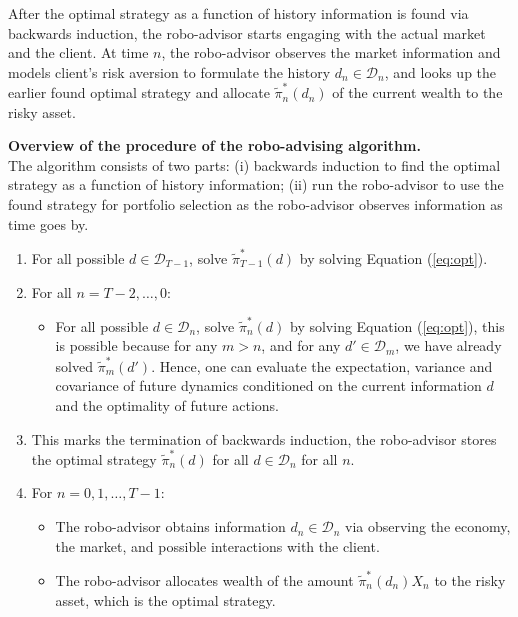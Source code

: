 After the optimal strategy as a function of history information is found via backwards induction, the robo-advisor starts engaging with the actual market and the client. At time $n$, the robo-advisor observes the market information and models client's risk aversion to formulate the history $d_n\in\mathcal{D}_n$, and looks up the earlier found optimal strategy and allocate $\tilde\pi^*_n(d_n)$ of the current wealth to the risky asset.

\begin{algorithm}[t]
  \caption{\textbf{Overview of the procedure of the robo-advising algorithm.}\\The algorithm consists of two parts: (i) backwards induction to find the optimal strategy as a function of history information; (ii) run the robo-advisor to use the found strategy for portfolio selection as the robo-advisor observes information as time goes by.}\label{alg}
  \begin{spacing}{1.15}
  \begin{enumerate}
    \item For all possible $d\in\mathcal{D}_{T-1}$, solve $\tilde\pi_{T-1}^*(d)$ by solving Equation (\ref{eq:opt}).
    \item For all $n=T-2,\ldots,0$:\begin{itemize}
        \item For all possible $d\in\mathcal{D}_n$, solve $\tilde\pi_n^*(d)$ by solving Equation (\ref{eq:opt}), this is possible because for any $m>n$, and for any $d'\in\mathcal{D}_m$, we have already solved $\tilde\pi_m^*(d')$. Hence, one can evaluate the expectation, variance and covariance of future dynamics conditioned on the current information $d$ and the optimality of future actions.
    \end{itemize}
    \item This marks the termination of backwards induction, the robo-advisor stores the optimal strategy $\tilde\pi_n^*(d)$ for all $d\in\mathcal{D}_n$ for all $n$.
    \item For $n=0,1,\ldots,T-1$:\begin{itemize}
        \item The robo-advisor obtains information $d_n\in\mathcal D_n$ via observing the economy, the market, and possible interactions with the client.
        \item The robo-advisor allocates wealth of the amount $\tilde\pi_n^*(d_n)X_n$ to the risky asset, which is the optimal strategy.
    \end{itemize}
\end{enumerate}
  \end{spacing}
\end{algorithm}


